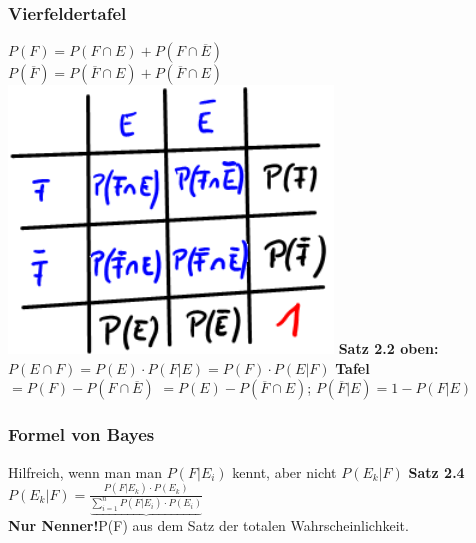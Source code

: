   	\subsubsection{Vierfeldertafel}
  	$ P(F) = P(F \cap E ) + P(F \cap \overline{E}) $\\
  	$ P(\overline {F}) = P(\overline{F} \cap E) + P(\overline{F} \cap E) $\\
  	\includegraphics[scale=0.25]{./pic/Vierfeldertafel}
  	\textbf{Satz 2.2 oben: }
  	$ P(E \cap F)  =  P(E) \cdot P(F|E) = P(F) \cdot P(E|F) $
  	\textbf{Tafel}
  	$ = P(F) - P(F \cap \overline{E}) $
  	$ = P(E) - P(\overline{F} \cap E) $; 
  $ P(\overline{F} | E) = 1 - P(F | E) $
  \subsubsection{Formel von Bayes}
  Hilfreich, wenn man man $P( F | E_{i} )$ kennt, aber nicht $P(E_{k}|F)$
  \textbf{Satz 2.4}
  $P(E_{k} | F) = \frac{ P(F | E_{k}) \cdot P(E_{k})}{ \underbrace{\sum_{i=1}^{n}P(F|E_{i}) \cdot P(E_{i})}}$\\
\textbf{Nur Nenner!}P(F) aus dem Satz der totalen Wahrscheinlichkeit.
